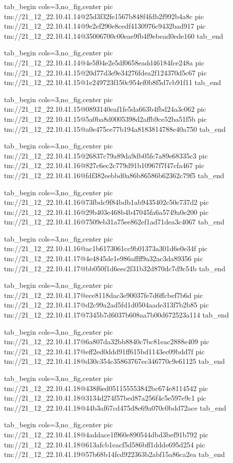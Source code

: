 \ifcmt
  tab_begin cols=3,no_fig,center
    pic tm://21_12_22.10.41.14@25d3f32fe1567b848f4fdb2f992b4a8c
    pic tm://21_12_22.10.41.14@9e2ef290e8cedf4130976c9432bad917
    pic tm://21_12_22.10.41.14@35006700c00eae9fb4f9ebead0ede160
  tab_end
\fi


\ifcmt
  tab_begin cols=3,no_fig,center
    pic tm://21_12_22.10.41.14@4e5f04e2e5df0658eadd46184fce248a
    pic tm://21_12_22.10.41.15@20d77d3e9e34276fdea2f124370d5c67
    pic tm://21_12_22.10.41.15@1e249723f150c954ef0b8f5d7cb91f11
  tab_end
\fi


\ifcmt
  tab_begin cols=3,no_fig,center
    pic tm://21_12_22.10.41.15@0893140eaf1fe5da663b4fbd24a3c062
    pic tm://21_12_22.10.41.15@5a0ba8d0005398d2affb9ce52ba51f5b
    pic tm://21_12_22.10.41.15@a0e475ce77b194a8183814788e40a750
  tab_end
\fi


\ifcmt
  tab_begin cols=3,no_fig,center
    pic tm://21_12_22.10.41.15@26837c79a89da9db05fc7a89e68335c3
    pic tm://21_12_22.10.41.16@827c6ec2c779d91b10967f7f47cfa467
    pic tm://21_12_22.10.41.16@fdf382eebbd0a86b86586b62362c79f5
  tab_end
\fi


\ifcmt
  tab_begin cols=3,no_fig,center
    pic tm://21_12_22.10.41.16@73fbdc9f84bdb1ab9435402c50e737d2
    pic tm://21_12_22.10.41.16@29b403e468b4b47045fa6a5749a0e200
    pic tm://21_12_22.10.41.16@7509eb31a75ee862ef1ad71dea3c4067
  tab_end
\fi


\ifcmt
  tab_begin cols=3,no_fig,center
    pic tm://21_12_22.10.41.16@ac1b6173061cc9b01373a301d6e0e34f
    pic tm://21_12_22.10.41.17@4e4845de1e986affff9a32ac3da89356
    pic tm://21_12_22.10.41.17@bb050f1d6eec2f31b32d870dc7d9c54b
  tab_end
\fi


\ifcmt
  tab_begin cols=3,no_fig,center
    pic tm://21_12_22.10.41.17@ece8118dac3e90037fe7d6ffcbef7b6d
    pic tm://21_12_22.10.41.17@d2c99a2ad5fd1d0504aade313f7b2b85
    pic tm://21_12_22.10.41.17@7345b7d6037b608aa7b00d672523a114
  tab_end
\fi


\ifcmt
  tab_begin cols=3,no_fig,center
    pic tm://21_12_22.10.41.17@6a807da32bb8840c7bc81eac2888e409
    pic tm://21_12_22.10.41.17@eff2ed0ddd91ff615bd1143ec09bdd7f
    pic tm://21_12_22.10.41.18@d30c354c35863767ec346770c9e61125
  tab_end
\fi


\ifcmt
  tab_begin cols=3,no_fig,center
    pic tm://21_12_22.10.41.18@438f6ed051155553842bc674e8114542
    pic tm://21_12_22.10.41.18@3134d274f57bed87a256f4c5e597e9c1
    pic tm://21_12_22.10.41.18@44b3af67cd475d8e69a070c0bdd72ace
  tab_end
\fi


\ifcmt
  tab_begin cols=3,no_fig,center
    pic tm://21_12_22.10.41.18@4addace1f960e890544dbd3bef91b792
    pic tm://21_12_22.10.41.18@613afcb1eacf5d586bff1ddde695d254
    pic tm://21_12_22.10.41.19@57b68b14fcd922363b2abf15a86ca2ea
  tab_end
\fi


